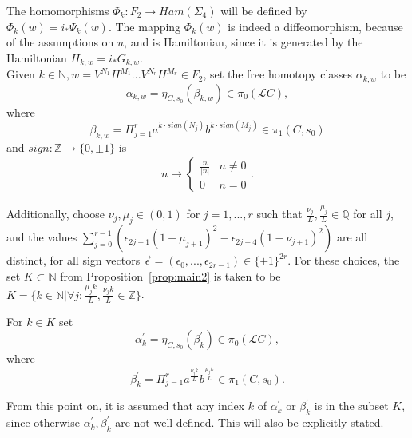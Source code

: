 \documentclass[11pt]{article}
\newenvironment{myequation}
    {
        \begin{equation*}
        \begin{gathered}
    }
    { 
        \end{gathered} 
        \end{equation*}
    }
\newcommand{\N}{\mathbb{N}}
\newcommand{\Q}{\mathbb{Q}}
\newcommand{\Z}{\mathbb{Z}}
\begin{document}
            The homomorphisms $\Phi_k: F_2 \to Ham(\Sigma_4)$ will be defined by $\Phi_k(w) = i_* \Psi_k(w)$. The mapping $\Phi_k(w)$ is indeed a diffeomorphism, because of the assumptions on $u$, and is Hamiltonian, since it is generated by the Hamiltonian $H_{k,w} = i_* G_{k,w}$. \\
            
            Given $k \in \N, w = V^{N_1} H^{M_1} ... V^{N_r} H^{M_r} \in F_2$, set the free homotopy classes $\alpha_{k,w}$ to be
            \[
                \alpha_{k,w} = \eta_{C,s_0}(\beta_{k,w}) \in \pi_0(\mathscr{L}C) ,
            \]
            where
            \[
                \beta_{k,w} = \Pi_{j=1}^r a^{k \cdot sign(N_j)} b^{k \cdot sign(M_j)} \in \pi_1(C,s_0)
            \]
            and $sign: \Z \to \{0, \pm1\}$ is
            \begin{myequation}
                n \mapsto
                \left\{\begin{array}{ll}
                    \frac{n}{|n|}  & n \neq 0 \\
                    0              & n = 0
                \end{array}\right. .
            \end{myequation}
            
            Additionally, choose $\nu_j,\mu_j \in (0,1)$ for $j=1,...,r$ such that $\frac{\nu_j}{L},\frac{\mu_j}{L} \in \Q$ for all $j$, and the values $\sum_{j=0}^{r-1} (\epsilon_{2j+1}(1-\mu_{j+1})^2 - \epsilon_{2j+4}(1-\nu_{j+1})^2)$ are all distinct, for all sign vectors $\vec\epsilon = (\epsilon_0,...,\epsilon_{2r-1}) \in \{\pm 1\}^{2r}$. For these choices, the set $K \subset \N$ from Proposition~\ref{prop:main2} is taken to be $K = \{k \in \N | \forall j: \frac{\mu_j k}{L}, \frac{\nu_j k}{L} \in \Z \}$.
            
            For $k \in K$ set
            \[
                \alpha_k^\prime = \eta_{C,s_0}(\beta_k^\prime) \in \pi_0(\mathscr{L}C) ,
            \]
            where
            \[
                \beta_k^\prime = \Pi_{j=1}^r a^{\frac{\nu_j k}{L}} b^{\frac{\mu_j k}{L}} \in \pi_1(C,s_0) .
            \]
            
            From this point on, it is assumed that any index $k$ of $\alpha_k^\prime$ or $\beta_k^\prime$ is in the subset $K$, since otherwise $\alpha_k^\prime, \beta_k^\prime$ are not well-defined. This will also be explicitly stated. \\
            
\end{document}
